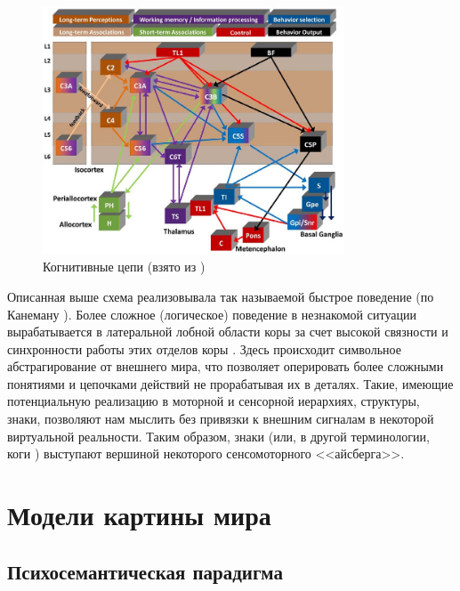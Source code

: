 \documentclass[12pt]{report}
\begin{document}
	\begin{figure}
		\centering
		\includegraphics[width=0.8\textwidth]{misc/phisio/cognitive_flow}
		\caption{Когнитивные цепи (взято из \cite{Solari2011})}
		\label{fig:cog_flow}		
	\end{figure}

	Описанная выше схема реализовывала так называемой быстрое поведение (по Канеману \cite{Kahneman2011}). Более сложное (логическое) поведение в незнакомой ситуации вырабатывается в латеральной лобной области коры \cite{Cole2013} за счет высокой связности и синхронности работы этих отделов коры \cite{Baars2013}. Здесь происходит символьное абстрагирование от внешнего мира, что позволяет оперировать более сложными понятиями и цепочками действий не прорабатывая их в деталях. Такие, имеющие потенциальную реализацию в моторной и сенсорной иерархиях, структуры, знаки, позволяют нам мыслить без привязки к внешним сигналам в некоторой виртуальной реальности. Таким образом, знаки (или, в другой терминологии, коги \cite{Anokhin2016}) выступают вершиной некоторого сенсомоторного <<айсберга>>.

	
	\printbibliography[keyword={neuro},resetnumbers=true]
	
	\chapter{Модели картины мира}
	\section{Психосемантическая парадигма}
	
\end{document}
